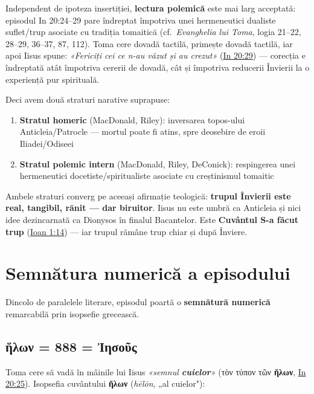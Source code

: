 \documentclass[12pt,a4paper,twoside,openany]{book}
\begin{document}
Independent de ipoteza insertiției, \textbf{lectura polemică} este mai larg acceptată: episodul In 20:24--29 pare îndreptat împotriva unei hermeneutici dualiste suflet/trup asociate cu tradiția tomaitică (cf.\ \textit{Evanghelia lui Toma}, logia 21--22, 28--29, 36--37, 87, 112). Toma cere dovadă tactilă, primește dovadă tactilă, iar apoi Iisus spune: \textit{«Fericiți cei ce n-au văzut și au crezut»} (\href{https://bibliaortodoxa.ro/carte.php?id=35\&cap=20\#29}{In 20:29}) --- corecția e îndreptată atât împotriva cererii de dovadă, cât și împotriva reducerii Învierii la o experiență pur spirituală.

Deci avem două straturi narative suprapuse:

\begin{enumerate}
  \item \textbf{Stratul homeric} (MacDonald, Riley): inversarea topos-ului Anticleia/Patrocle --- mortul poate fi atins, spre deosebire de eroii Iliadei/Odiseei
  \item \textbf{Stratul polemic intern} (MacDonald, Riley, DeConick): respingerea unei hermeneutici docetiste/spiritualiste asociate cu creștinismul tomaitic
\end{enumerate}

Ambele straturi converg pe aceeași afirmație teologică: \textbf{trupul Învierii este real, tangibil, rănit --- dar biruitor}. Iisus nu este umbră ca Anticleia și nici idee dezincarnată ca Dionysos în finalul Bacantelor. Este \textbf{Cuvântul S-a făcut trup} (\href{https://bibliaortodoxa.ro/carte.php?id=35\&cap=1\#14}{Ioan 1:14}) --- iar trupul rămâne trup chiar și după Înviere.

\section{Semnătura numerică a episodului}

Dincolo de paralelele literare, episodul poartă o \textbf{semnătură numerică} remarcabilă prin isopsefie grecească.

\subsection{ἥλων = 888 = Ἰησοῦς}

Toma cere să vadă în mâinile lui Iisus \textit{«semnul \textbf{cuielor}»} (τὸν τύπον τῶν \textbf{ἥλων}, \href{https://bibliaortodoxa.ro/carte.php?id=35\&cap=20\#25}{In 20:25}). Isopsefia cuvântului \textbf{ἥλων} (\textit{hēlōn}, „al cuielor"):
\end{document}
